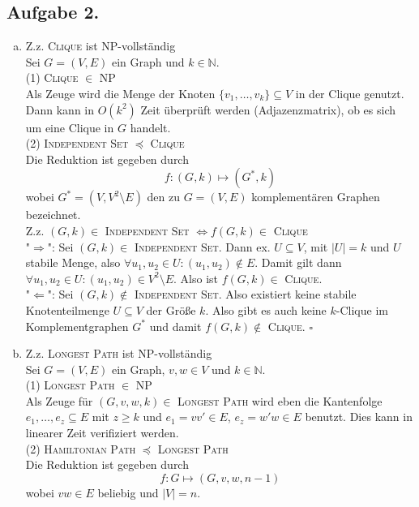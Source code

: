 \documentclass[11pt,a4paper,ngerman]{article}
\begin{document}
\subsection*{Aufgabe 2.}
\begin{enumerate}[a)]
\item Z.z. \textsc{Clique} ist NP-vollständig \\
Sei $G = (V,E)$ ein Graph und $k \in \mathbb{N}$.\\
(1) \textsc{Clique} $\in$ NP \\
Als Zeuge wird die Menge der Knoten $\{v_1,\ldots,v_k \} \subseteq V $ in der Clique genutzt. Dann kann in $O(k^2)$ Zeit überprüft werden (Adjazenzmatrix), ob es sich um eine Clique in $G$ handelt.\\
(2) \textsc{Independent Set} $\preceq$ \textsc{Clique} \\
Die Reduktion ist gegeben durch
$$ f: (G, k) \mapsto (G^*, k)$$
wobei $G^* = (V, V^2 \setminus E)$ den zu $G = (V,E)$ komplementären Graphen bezeichnet. \\
Z.z. $(G,k) \in $ \textsc{Independent Set} $\Leftrightarrow f(G,k) \in $ \textsc{Clique}\\
"$\Rightarrow$": Sei $(G,k) \in$ \textsc{Independent Set}.
Dann ex. $U \subseteq V$, mit $|U| = k$ und $U$ stabile Menge, also $\forall u_1, u_2 \in U: (u_1,u_2) \notin E$. Damit gilt dann $\forall u_1, u_2 \in U: (u_1,u_2) \in V^2 \setminus E$. Also ist $f(G,k) \in$ \textsc{Clique}. \\
"$\Leftarrow$": Sei $(G,k) \notin$ \textsc{Independent Set}.
Also existiert keine stabile Knotenteilmenge $U \subseteq V$ der Größe $k$. Also gibt es auch keine $k$-Clique im Komplementgraphen $G^*$ und damit $f(G,k) \notin$ \textsc{Clique}.
\mbox{} \hfill $\square$
\item Z.z. \textsc{Longest Path} ist NP-vollständig \\
Sei $G = (V,E)$ ein Graph, $v,w \in V$ und $k \in \mathbb{N}$. \\
(1) \textsc{Longest Path} $\in$ NP \\
Als Zeuge für $(G,v,w,k) \in$ \textsc{Longest Path} wird eben die Kantenfolge $e_1,\ldots,e_z \subseteq E$ mit $z \geq k$ und $e_1 = vv' \in E$, $e_z = w'w \in E$ benutzt. Dies kann in linearer Zeit verifiziert werden. \\
(2) \textsc{Hamiltonian Path} $\preceq$ \textsc{Longest Path} \\
Die Reduktion ist gegeben durch
$$ f: G \mapsto (G,v,w,n-1)$$
wobei $vw \in E$ beliebig und $|V| = n$. \\

\end{enumerate}
\end{document}
